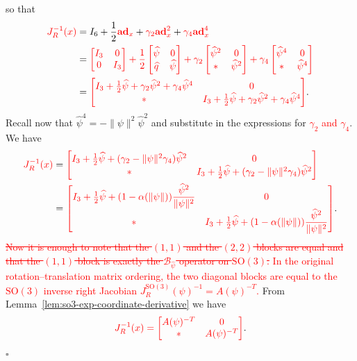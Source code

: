 \documentclass[11pt]{article}
\newcommand{\rev}[1]{\textcolor{red}{#1}}
\newcommand{\del}[1]{\textcolor{red}{\sout{#1}}}
\newcommand{\bad}{\mathbf{ad}}
\newcommand{\JR}{J_R}
\newcommand{\SO}{\mathrm{SO}}
\newcommand{\proofbox}{\hfill$\square$}
\begin{document}
so that
\begin{align*}
\rev{\JR^{-1}(x)}
&=I_6+\frac12\rev{\bad_x}+\rev{\gamma_2}\rev{\bad_x^2}+\rev{\gamma_4}\rev{\bad_x^4}\\
&=\rev{\begin{bmatrix}I_3&0\\0&I_3\end{bmatrix}
+\frac12\begin{bmatrix}\widehat\psi&0\\\widehat q&\widehat\psi\end{bmatrix}
+\gamma_2\begin{bmatrix}\widehat\psi^2&0\\ *&\widehat\psi^2\end{bmatrix}
+\gamma_4\begin{bmatrix}\widehat\psi^4&0\\ *&\widehat\psi^4\end{bmatrix}}\\
&=\rev{\begin{bmatrix}
I_3+\frac12\widehat\psi+\gamma_2\widehat\psi^2+\gamma_4\widehat\psi^4&0\\
*&I_3+\frac12\widehat\psi+\gamma_2\widehat\psi^2+\gamma_4\widehat\psi^4
\end{bmatrix}}.
\end{align*}
Recall now that $\widehat\psi^4=-\|\psi\|^2\widehat\psi^2$ and substitute in the expressions for \rev{$\gamma_2$ and $\gamma_4$}. We have
\begin{align*}
\rev{\JR^{-1}(x)}
&=\rev{\begin{bmatrix}
I_3+\frac12\widehat\psi+(\gamma_2-\|\psi\|^2\gamma_4)\widehat\psi^2&0\\
*&I_3+\frac12\widehat\psi+(\gamma_2-\|\psi\|^2\gamma_4)\widehat\psi^2
\end{bmatrix}}\\
&=\rev{\begin{bmatrix}
I_3+\frac12\widehat\psi+(1-\alpha(\|\psi\|))\dfrac{\widehat\psi^2}{\|\psi\|^2}&0\\
*&I_3+\frac12\widehat\psi+(1-\alpha(\|\psi\|))\dfrac{\widehat\psi^2}{\|\psi\|^2}
\end{bmatrix}}.
\end{align*}
\del{Now it is enough to note that the $(1,1)$ and the $(2,2)$ blocks are equal and that the $(1,1)$ block is exactly the $\mathcal B_{\widehat\psi}$ operator on $\SO(3)$.} \rev{In the original rotation--translation matrix ordering, the two diagonal blocks are equal to the $\SO(3)$ inverse right Jacobian $J_R^{\SO(3)}(\psi)^{-1}=A(\psi)^{-T}$.} From Lemma~\ref{lem:so3-exp-coordinate-derivative} we have
\begin{equation*}
\rev{\JR^{-1}(x)=\begin{bmatrix}A(\psi)^{-T}&0\\ *&A(\psi)^{-T}\end{bmatrix}}.
\end{equation*}
\proofbox
\end{document}
